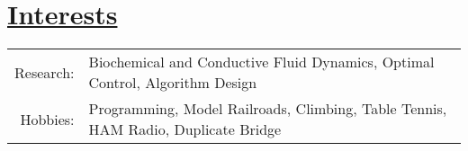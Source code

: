 \section*{\underline{Interests}}
\begin{tabular}{r | l}
Research:   &Biochemical and Conductive Fluid Dynamics, Optimal Control, Algorithm Design\\
Hobbies:    &Programming, Model Railroads, Climbing, Table Tennis, HAM Radio, Duplicate Bridge
\end{tabular}